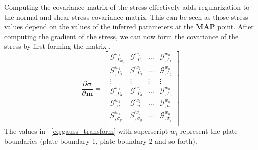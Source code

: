 \documentclass[12pt]{article}
\newcommand{\mm}{{\ensuremath{\boldsymbol{m}}}}
\newcommand{\ssigma}{{\ensuremath{\boldsymbol{\sigma}}}}
\begin{document}
Computing the covariance matrix of the stress effectively adds regularization to the normal and shear stress covariance matrix. This can be seen as those stress values depend on the values of the inferred parameters at the \textbf{MAP} point. After computing the gradient of the stress, we can now form the covariance of the stress by first forming the matrix ,
\begin{equation}
\frac{\partial \ssigma}{\partial \mm}=
  \begin{bmatrix}
    \mathcal G^{w_1}_{,\Gamma_{w_1}}  & \mathcal G^{w_2}_{,\Gamma_{1}} & \hdots & \mathcal G^{w_n}_{,\Gamma_{1}} \\
    \mathcal G^{w_1}_{,\Gamma_{2}} & \mathcal G^{w_2}_{,\Gamma_{2}}  &  \hdots & \mathcal G^{w_n}_{,\Gamma_{2}} \\
    \vdots & \vdots & \vdots & \vdots  \\
    \mathcal G^{w_1}_{,\Gamma_{3}} & \mathcal G^{w_2}_{,\Gamma_{3}} &   \hdots & \mathcal G^{w_n}_{,\Gamma_{3}} \\
    \mathcal G^{w_1}_{,n} & \mathcal G^{w_2}_{,n} &  \hdots & \mathcal G^{w_n}_{,n} \\
    \mathcal G^{w_1}_{,\sigma_y} & \mathcal G^{w_2}_{,\sigma_y} &  \hdots & \mathcal G^{w_n}_{,\sigma_y} \\

\end{bmatrix}
\label{eq:gauss_transform}
\end{equation}
The values in ~\eqref{eq:gauss_transform} with superscript $w_i$ represent the  plate boundaries (plate boundary 1, plate boundary 2 and so forth).
\end{document}
